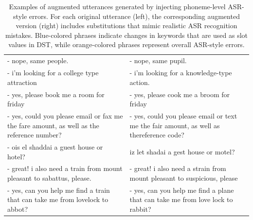 \begin{table}[h!]
{\begin{tabular}{p{}p{}}
- nope, same \textcolor{myOrange}{people}.  
&-  nope, same \textcolor{myOrange}{pupil}. \\

- i'm looking for a \textcolor{myBlue}{college} type \textcolor{myBlue}{attraction}  
& - i'm looking for a \textcolor{myBlue}{knowledge}-type \textcolor{myBlue}{action}. \\

- yes, please \textcolor{myOrange}{book} me a \textcolor{myOrange}{room} for friday
& - yes, please \textcolor{myOrange}{cook} me a \textcolor{myOrange}{broom} for friday \\

- yes, could you please email or \textcolor{myOrange}{fax} me the \textcolor{myOrange}{fare} amount, as well as the reference number?  
& - yes, could you please email or \textcolor{myOrange}{text} me the \textcolor{myOrange}{fair} amount, as well as thereference code? \\

- \textcolor{myBlue}{ois el shaddai} a \textcolor{myOrange}{guest house} or \textcolor{myBlue}{hotel}?  
& \textcolor{myBlue}{iz let shadai} a \textcolor{myOrange}{gest house} or \textcolor{myBlue}{motel}? \\

- great! i also need a \textcolor{myBlue}{train} from \textcolor{myBlue}{mount pleasant} to \textcolor{myBlue}{sabattus}, please.  
& - great! i also need a \textcolor{myBlue}{strain} from \textcolor{myBlue}{mount pleasant} to \textcolor{myBlue}{suspicious}, please \\

- yes, can you help me find a \textcolor{myBlue}{train} that can take me from \textcolor{myBlue}{lovelock} to \textcolor{myBlue}{abbot}?  
& - yes, can you help me find a \textcolor{myBlue}{plane} that can take me from \textcolor{myBlue}{love lock} to \textcolor{myBlue}{rabbit}? \\


\bottomrule
\end{tabular}
}
\caption{
Examples of augmented utterances generated by injecting phoneme-level ASR-style errors. For each original utterance (left), the corresponding augmented version (right) includes substitutions that mimic realistic ASR recognition mistakes.  
\textcolor{myBlue}{Blue-colored phrases} indicate changes in keywords that are used as slot values in DST, while \textcolor{myOrange}{orange-colored phrases} represent overall ASR-style errors.
}

\label{tab:table_asr_examples}
\end{table}


